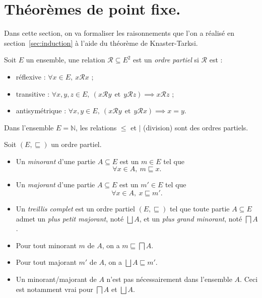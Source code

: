 \documentclass[../main]{subfiles}
\begin{document}
  \chapter{Théorèmes de point fixe.}

  \minitoc


  Dans cette section, on va formaliser les raisonnements que l'on a réalisé en section~\ref{sec:induction} à l'aide du théorème de Knaster-Tarksi.

  \begin{defn}
    Soit $E$ un ensemble, une relation $\mathcal{R} \subseteq E^2$ est un \textit{ordre partiel} si $\mathcal{R}$ est :
    \newcommand{\relR}{\ensuremath{\mathrel{\mathcal{R}}}}
    \begin{itemize}
      \item réflexive : $\forall x \in E, \ x \relR x $ ;
      \item transitive : $\forall x,y,z \in E, \ (x \relR y \ \ \text{et}\ \ y \relR z) \implies x \relR z  $ ;
      \item antisymétrique : $\forall x,y \in E, \ (x \relR y \ \ \text{et}\ \ y \relR x) \implies x = y $.
    \end{itemize}
  \end{defn}

  \begin{exm}
    Dans l'ensemble $E = \mathds{N}$, les relations $\le$ et $\mid$ (division) sont des ordres partiels.
  \end{exm}

  \begin{defn}
    Soit $(E, \sqsubseteq)$ un ordre partiel.
    \begin{itemize}
      \item Un \textit{minorant} d'une partie $A \subseteq E$ est un $m \in E$ tel que  \[
      \forall x \in A,\  m \sqsubseteq x
      .\]
      \item Un \textit{majorant} d'une partie $A \subseteq E$ est un $m' \in E$ tel que  \[
      \forall x \in A, \ x \sqsubseteq m'
      .\]
      \item Un \textit{treillis complet} est un ordre partiel $(E, \sqsubseteq)$ tel que toute partie $A \subseteq E$ admet un \textit{plus petit majorant}, noté $\bigsqcup A$, et un \textit{plus grand minorant}, noté $\bigsqcap A$.
    \end{itemize}
  \end{defn}

  \begin{rmk}
    \begin{itemize}
      \item Pour tout minorant $m$ de $A$, on a $m \sqsubseteq \bigsqcap A$.
      \item Pour tout majorant $m'$ de $A$, on a $\bigsqcup A \sqsubseteq m'$.
      \item Un minorant/majorant de $A$ n'est pas nécessairement dans l'ensemble $A$. Ceci est notamment vrai pour $\bigsqcap A$ et $\bigsqcup A$.
    \end{itemize}
  \end{rmk}
\end{document}
